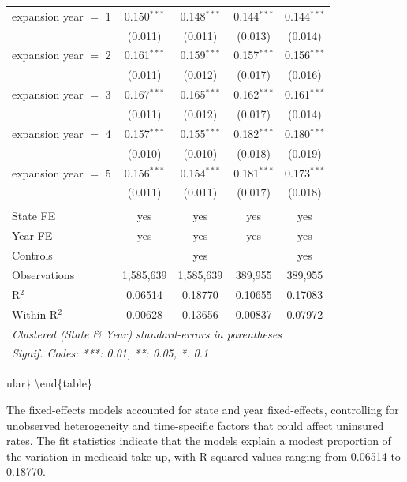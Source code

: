 \documentclass[
]{article}
\begin{document}
\begin{table}[htbp]
\begin{tabular}{lcccc}
      expansion year $=$ 1  & 0.150$^{***}$ & 0.148$^{***}$ & 0.144$^{***}$  & 0.144$^{***}$\\   
                            & (0.011)       & (0.011)       & (0.013)        & (0.014)\\   
      expansion year $=$ 2  & 0.161$^{***}$ & 0.159$^{***}$ & 0.157$^{***}$  & 0.156$^{***}$\\   
                            & (0.011)       & (0.012)       & (0.017)        & (0.016)\\   
      expansion year $=$ 3  & 0.167$^{***}$ & 0.165$^{***}$ & 0.162$^{***}$  & 0.161$^{***}$\\   
                            & (0.011)       & (0.012)       & (0.017)        & (0.014)\\   
      expansion year $=$ 4  & 0.157$^{***}$ & 0.155$^{***}$ & 0.182$^{***}$  & 0.180$^{***}$\\   
                            & (0.010)       & (0.010)       & (0.018)        & (0.019)\\   
      expansion year $=$ 5  & 0.156$^{***}$ & 0.154$^{***}$ & 0.181$^{***}$  & 0.173$^{***}$\\   
                            & (0.011)       & (0.011)       & (0.017)        & (0.018)\\   
       \\
      State FE              & yes           & yes           & yes            & yes\\  
      Year FE               & yes           & yes           & yes            & yes\\  
      Controls              &               & yes           &                & yes\\  
      Observations          & 1,585,639     & 1,585,639     & 389,955        & 389,955\\  
      R$^2$                 & 0.06514       & 0.18770       & 0.10655        & 0.17083\\  
      Within R$^2$          & 0.00628       & 0.13656       & 0.00837        & 0.07972\\  
      \midrule \midrule
      \multicolumn{5}{l}{\emph{Clustered (State \& Year) standard-errors in parentheses}}\\
      \multicolumn{5}{l}{\emph{Signif. Codes: ***: 0.01, **: 0.05, *: 0.1}}\\
   \end{tabular}
\end{table}

ular\} \textbackslash end\{table\}

The fixed-effects models accounted for state and year fixed-effects,
controlling for unobserved heterogeneity and time-specific factors that
could affect uninsured rates. The fit statistics indicate that the
models explain a modest proportion of the variation in medicaid take-up,
with R-squared values ranging from 0.06514 to 0.18770.
\end{document}
